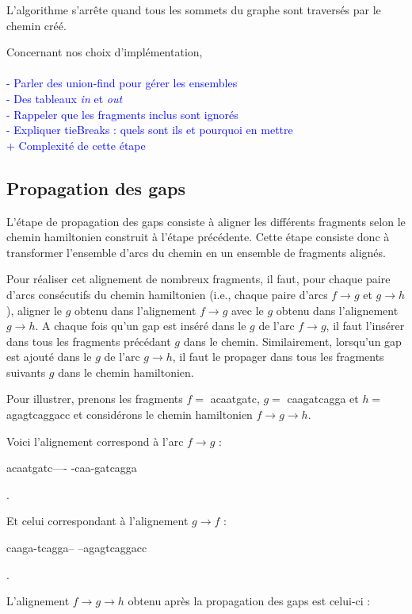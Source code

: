 \documentclass{article}
\begin{document}
L'algorithme s'arrête quand tous les sommets du graphe sont traversés par le chemin créé.

Concernant nos choix d'implémentation,
\\~\\
\textcolor{blue}{
- Parler des union-find pour gérer les ensembles\\
- Des tableaux \textit{in} et \textit{out}\\
- Rappeler que les fragments inclus sont ignorés\\
- Expliquer tieBreaks : quels sont ils et pourquoi en mettre\\
+ Complexité de cette étape
}

\subsection{Propagation des gaps}

L'étape de propagation des gaps consiste à aligner les différents fragments selon le chemin hamiltonien construit à l'étape précédente. Cette étape consiste donc à transformer l'ensemble d'arcs du chemin en un ensemble de fragments alignés. 

Pour réaliser cet alignement de nombreux fragments, il faut, pour chaque paire d'arcs consécutifs du chemin hamiltonien (i.e., chaque paire d'arcs $f \to g$ et $g \to h$), aligner le $g$ obtenu dans l'alignement $f \to g$ avec le $g$ obtenu dans l'alignement $g \to h$. A chaque fois qu'un gap est inséré dans le $g$ de l'arc $f \to g$, il faut l'insérer dans tous les fragments précédant $g$ dans le chemin. Similairement, lorsqu'un gap est ajouté dans le $g$ de l'arc $g \to h$, il faut le propager dans tous les fragments suivants $g$ dans le chemin hamiltonien. 

Pour illustrer, prenons les fragments $f =$ acaatgatc, $g =$ caagatcagga et $h =$ agagtcaggacc et considérons le chemin hamiltonien $f \to g \to h$.

Voici l'alignement correspond à l'arc $f \to g$ :  
\begin{boxedverbatim}
acaatgatc----
-caa-gatcagga
\end{boxedverbatim}.

Et celui correspondant à l'alignement $g \to f$ :  
\begin{boxedverbatim}
caaga-tcagga--
--agagtcaggacc
\end{boxedverbatim}.

L'alignement $f \to g \to h$ obtenu après la propagation des gaps est celui-ci : 
\end{document}
